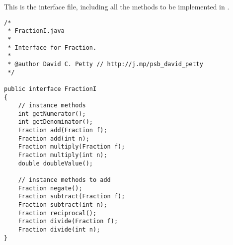 \documentclass{article}%
\begin{document}
\begin{multicols}{2}
This is the  interface file, including all the methods to be implemented in . \\

\begin{lstlisting}[caption=\code{\href{https://pastebin.com/5btYEgPs}{FractionI.java}},label=FractionI]
/*
 * FractionI.java
 *
 * Interface for Fraction.
 *
 * @author David C. Petty // http://j.mp/psb_david_petty
 */

public interface FractionI
{
    // instance methods
    int getNumerator();
    int getDenominator();
    Fraction add(Fraction f);
    Fraction add(int n);
    Fraction multiply(Fraction f);
    Fraction multiply(int n);
    double doubleValue();

    // instance methods to add
    Fraction negate();
    Fraction subtract(Fraction f);
    Fraction subtract(int n);
    Fraction reciprocal();
    Fraction divide(Fraction f);
    Fraction divide(int n);
}
\end{lstlisting}

\end{multicols}


\end{document}
